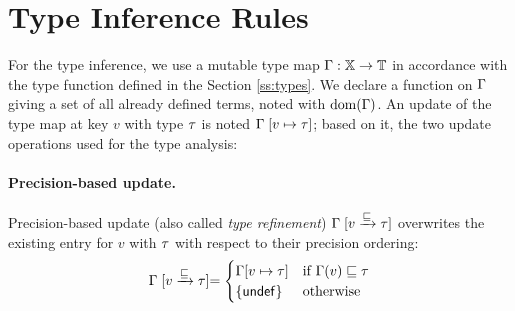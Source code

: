 %
%
%

\section{Type Inference Rules}
\label{sec:inference}

For the type inference, we use a mutable type map $\Gamma: \mathbb{X} \to \mathbb{T}$ in accordance with the type function defined in the Section \ref{ss:types}.
We declare a function on $\Gamma$ giving a set of all already defined terms, noted with $\mathrm{dom}(\Gamma)$.
An update of the type map at key $v$ with type $\tau$ is noted $\Gamma \mathrel{[v \mapsto \tau]}$; based on it, the two update operations used for the type analysis:

\paragraph{Precision-based update.}
Precision-based update (also called \emph{type refinement}) $\Gamma \mathrel{[v \xrightarrow{\sqsubseteq} \tau]}$ overwrites the existing entry for $v$ with $\tau$ with respect to their precision ordering:
\[
\Gamma \mathrel{[v \xrightarrow{\sqsubseteq} \tau]} =
\begin{cases}
  \Gamma[v \mapsto \tau] & \text{if } \Gamma(v) \sqsubseteq \tau \\
  \{\mathsf{undef}\} & \text{otherwise}
\end{cases}
\]

